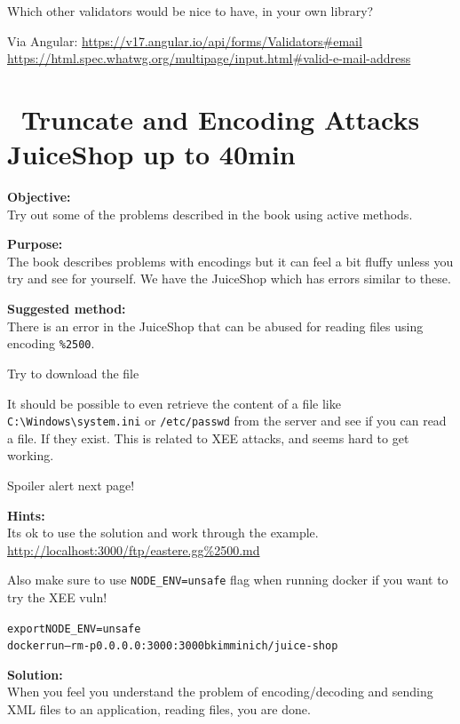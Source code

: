 \documentclass[a4paper,11pt,notitlepage]{report}
\begin{document}
Which other validators would be nice to have, in your own library?

Via Angular: \url{https://v17.angular.io/api/forms/Validators#email}\\
\url{https://html.spec.whatwg.org/multipage/input.html#valid-e-mail-address}

\chapter{\faExclamationTriangle\ Truncate and Encoding Attacks JuiceShop up to 40min}
\label{ex:truncate-encoding}

{\bf Objective:}\\
Try out some of the problems described in the book using active methods.

{\bf Purpose:}\\
The book describes problems with encodings but it can feel a bit fluffy unless you try and see for yourself. We have the JuiceShop which has errors similar to these.

{\bf Suggested method:}\\
There is an error in the JuiceShop that can be abused for reading files using encoding \verb+%2500+.

Try to download the file 


It should be possible to even retrieve the content of a file like \verb+C:\Windows\system.ini+ or
\verb+/etc/passwd+ from the server and see if you can read a file. If they exist. This is related to XEE attacks, and seems hard to get working.

Spoiler alert next page!
\eject



{\bf Hints:}\\
Its ok to use the solution and work through the example.
\url{http://localhost:3000/ftp/eastere.gg%2500.md}

Also make sure to use \verb+NODE_ENV=unsafe+ flag when running docker if you want to try the XEE vuln!

\begin{alltt}
export NODE_ENV=unsafe
docker run --rm -p 0.0.0.0:3000:3000 bkimminich/juice-shop
\end{alltt}

{\bf Solution:}\\
When you feel you understand the problem of encoding/decoding and sending XML files to an application, reading files, you are done.
\end{document}
